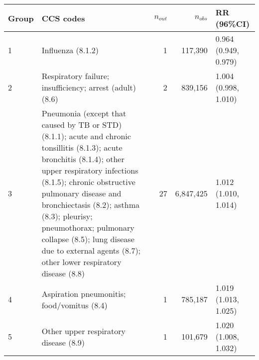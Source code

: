 \begin{tabular}{lp{6.5cm}rrp{2.2cm}}
  \hline
Group & CCS codes & $n_{out}$ & $n_{obs}$ & RR (96\%CI) \\ 
  \hline
   1 & Influenza (8.1.2) &    1 & 117,390 & 0.964 (0.949, 0.979) \\ 
     2 & Respiratory failure; insufficiency; arrest (adult) (8.6) &    2 & 839,156 & 1.004 (0.998, 1.010) \\ 
     3 & Pneumonia (except that caused by TB or STD) (8.1.1); acute and chronic tonsillitis (8.1.3); acute bronchitis (8.1.4); other upper respiratory infections (8.1.5); chronic obstructive pulmonary disease and bronchiectasis (8.2); asthma (8.3); pleurisy; pneumothorax; pulmonary collapse (8.5); lung disease due to external agents (8.7); other lower respiratory disease (8.8) &   27 & 6,847,425 & 1.012 (1.010, 1.014) \\ 
     4 & Aspiration pneumonitis; food/vomitus (8.4) &    1 & 785,187 & 1.019 (1.013, 1.025) \\ 
     5 & Other upper respiratory disease (8.9) &    1 & 101,679 & 1.020 (1.008, 1.032) \\ 
   \hline
\end{tabular}

